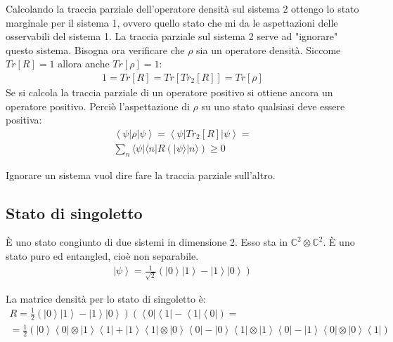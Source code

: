 Calcolando la traccia parziale dell'operatore densità sul sistema 2 ottengo lo stato marginale per il sistema 1, ovvero quello stato che mi da le aspettazioni delle osservabili del sistema 1. La traccia parziale sul sistema 2 serve ad "ignorare" questo sistema.
Bisogna ora verificare che $\rho$ sia un operatore densità. Siccome $Tr\left[R\right]=1$ allora anche $Tr\left[\rho\right]=1$:
\begin{equation}\begin{split}
1=Tr\left[R\right]=Tr\left[Tr_2\left[R\right]\right]=Tr\left[\rho\right]
\end{split}\end{equation}
Se si calcola la traccia parziale di un operatore positivo si ottiene ancora un operatore positivo. Perciò l'aspettazione di $\rho$ su uno stato qualsiasi deve essere positiva:
\begin{equation}\begin{split}
\left\langle \psi |\rho |\psi  \right\rangle=\left\langle \psi |Tr_2\left[R\right] | \psi  \right\rangle=\\
\sum_{n} \langle\psi|\langle n|R\left(|\psi\rangle|n\rangle \right) \ge 0
\end{split}\end{equation}

Ignorare un sistema vuol dire fare la traccia parziale sull'altro.

\subsection{Stato di singoletto} %
È uno stato congiunto di due sistemi in dimensione 2. Esso sta in $\mathbb{C} ^2\otimes \mathbb{C} ^2$. È uno stato puro ed entangled, cioè non separabile.
\begin{equation}\begin{split}
\left |\psi  \right\rangle=\frac{1}{\sqrt{2}}\left(\left |0 \right\rangle\left |1 \right\rangle-\left |1 \right\rangle\left |0 \right\rangle\right)
\end{split}\end{equation}

La matrice densità per lo stato di singoletto è:
\begin{equation}\begin{split}
R=\frac{1}{2}\left(\left |0 \right\rangle\left |1 \right\rangle - \left |1 \right\rangle\left |0 \right\rangle\right)\left(\left\langle 0\right |\left\langle 1\right |-\left\langle 1\right |\left\langle 0\right |\right)=\\
=\frac{1}{2}\left(\left |0 \right\rangle\left\langle 0\right |\otimes \left |1 \right\rangle\left\langle 1\right |+ \left |1 \right\rangle\left\langle 1\right |\otimes \left |0 \right\rangle\left\langle 0\right | - \left |0 \right\rangle\left\langle 1\right |\otimes \left |1 \right\rangle\left\langle 0\right | -\left |1 \right\rangle\left\langle 0\right | \otimes \left |0 \right\rangle\left\langle 1\right |\right)
\end{split}\end{equation}

